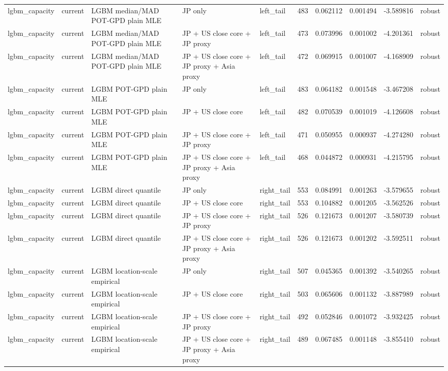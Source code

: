 \begin{tabular}{lll l lrrrrl}
lgbm\_capacity & current & LGBM median/MAD POT-GPD plain MLE & JP only & left\_tail & 483 & 0.062112 & 0.001494 & -3.589816 & robust \\
lgbm\_capacity & current & LGBM median/MAD POT-GPD plain MLE & JP + US close core + JP proxy & left\_tail & 473 & 0.073996 & 0.001002 & -4.201361 & robust \\
lgbm\_capacity & current & LGBM median/MAD POT-GPD plain MLE & JP + US close core + JP proxy + Asia proxy & left\_tail & 472 & 0.069915 & 0.001007 & -4.168909 & robust \\
lgbm\_capacity & current & LGBM POT-GPD plain MLE & JP only & left\_tail & 483 & 0.064182 & 0.001548 & -3.467208 & robust \\
lgbm\_capacity & current & LGBM POT-GPD plain MLE & JP + US close core & left\_tail & 482 & 0.070539 & 0.001019 & -4.126608 & robust \\
lgbm\_capacity & current & LGBM POT-GPD plain MLE & JP + US close core + JP proxy & left\_tail & 471 & 0.050955 & 0.000937 & -4.274280 & robust \\
lgbm\_capacity & current & LGBM POT-GPD plain MLE & JP + US close core + JP proxy + Asia proxy & left\_tail & 468 & 0.044872 & 0.000931 & -4.215795 & robust \\
lgbm\_capacity & current & LGBM direct quantile & JP only & right\_tail & 553 & 0.084991 & 0.001263 & -3.579655 & robust \\
lgbm\_capacity & current & LGBM direct quantile & JP + US close core & right\_tail & 553 & 0.104882 & 0.001205 & -3.562526 & robust \\
lgbm\_capacity & current & LGBM direct quantile & JP + US close core + JP proxy & right\_tail & 526 & 0.121673 & 0.001207 & -3.580739 & robust \\
lgbm\_capacity & current & LGBM direct quantile & JP + US close core + JP proxy + Asia proxy & right\_tail & 526 & 0.121673 & 0.001202 & -3.592511 & robust \\
lgbm\_capacity & current & LGBM location-scale empirical & JP only & right\_tail & 507 & 0.045365 & 0.001392 & -3.540265 & robust \\
lgbm\_capacity & current & LGBM location-scale empirical & JP + US close core & right\_tail & 503 & 0.065606 & 0.001132 & -3.887989 & robust \\
lgbm\_capacity & current & LGBM location-scale empirical & JP + US close core + JP proxy & right\_tail & 492 & 0.052846 & 0.001072 & -3.932425 & robust \\
lgbm\_capacity & current & LGBM location-scale empirical & JP + US close core + JP proxy + Asia proxy & right\_tail & 489 & 0.067485 & 0.001148 & -3.855410 & robust \\

\end{tabular}
